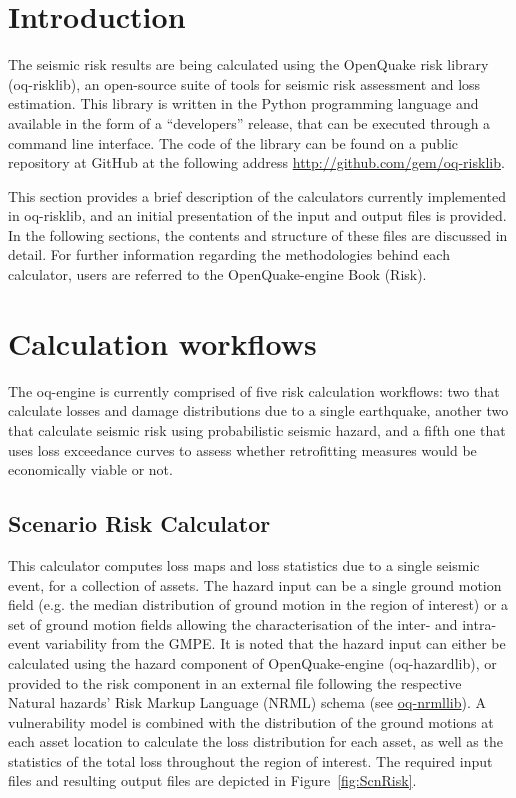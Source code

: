 \section{Introduction}
The seismic risk results are being calculated using the OpenQuake risk library (oq-risklib), an open-source suite of tools for seismic risk assessment and loss estimation. This library is written in the Python programming language and available in the form of a ``developers'' release, that can be executed through a command line interface. The code  of the library can be found on a public repository at GitHub at the following address \href{http://github.com/gem/oq-risklib}{http://github.com/gem/oq-risklib}.

This section provides a brief description of the calculators currently implemented in oq-risklib, and an initial presentation of the input and output files is provided. In the following sections, the contents and structure of these files are discussed in detail. For further information regarding the methodologies behind each calculator, users are referred to the OpenQuake-engine Book (Risk).

\section{Calculation workflows}
\label{sec:riskCalculators}
The oq-engine is currently comprised of five risk calculation workflows: two that calculate losses and damage distributions due to a single earthquake, another two that calculate seismic risk using probabilistic seismic hazard, and a fifth one that uses loss exceedance curves to assess whether retrofitting measures would be economically viable or not.

\subsection{Scenario Risk Calculator}
This calculator computes loss maps and loss statistics due to a single seismic event, for a collection of assets. The hazard input can be a single ground motion field (e.g. the median distribution of ground motion in the region of interest) or a set of ground motion fields allowing the characterisation of the inter- and intra-event variability from the GMPE. It is noted that the hazard input can either be calculated using the hazard component of OpenQuake-engine (oq-hazardlib), or provided to the risk component in an external file following the respective Natural hazards' Risk Markup Language (NRML) schema (see \href{http://github.com/gem/oq-nrmllib}{oq-nrmllib}).
A vulnerability model is combined with the distribution of the ground motions at each asset location to calculate the loss distribution for each asset, as well as the statistics of the total loss throughout the region of interest. The required input files and resulting output files are depicted in Figure~\ref{fig:ScnRisk}.

